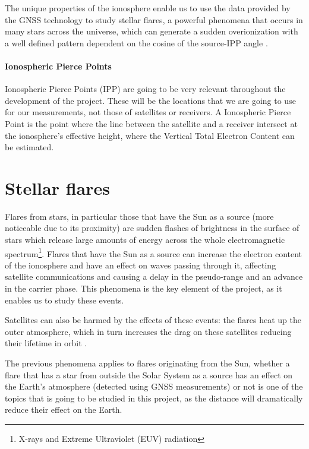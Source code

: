 The unique properties of the ionosphere enable us to use the data provided by the GNSS technology to study stellar flares, a powerful phenomena that occurs in many stars across the universe, which can generate a sudden overionization with a well defined pattern dependent on the cosine of the source-IPP angle \cite{hernandez2012gnss}. 

\paragraph{Ionospheric Pierce Points}

Ionospheric Pierce Points (IPP) are going to be very relevant throughout the development of the project. These will be the locations that we are going to use for our measurements, not those of satellites or receivers. A Ionospheric Pierce Point is the point where the line between the satellite and a receiver intersect at the ionosphere's effective height, where the Vertical Total Electron Content can be estimated. \cite{fu2000satellite}

\section{Stellar flares}

Flares from stars, in particular those that have the Sun as a source (more noticeable due to its proximity) are sudden flashes of brightness in the surface of stars which release large amounts of energy across the whole electromagnetic spectrum\footnote{X-rays and Extreme Ultraviolet (EUV) radiation}.
Flares that have the Sun as a source can increase the electron content of the ionosphere and have an effect on waves passing through it, affecting satellite communications and causing a delay in the pseudo-range and an advance in the carrier phase. This phenomena is the key element of the project, as it enables us to study these events.

Satellites can also be harmed by the effects of these events: the flares heat up the outer atmosphere, which in turn increases the drag on these satellites reducing their lifetime in orbit \cite{hernandez2012gnss}.

The previous phenomena applies to flares originating from the Sun, whether a flare that has a star from outside the Solar System as a source has an effect on the Earth’s atmosphere (detected using GNSS measurements) or not is one of the topics that is going to be studied in this project, as the distance will dramatically reduce their effect on the Earth.

